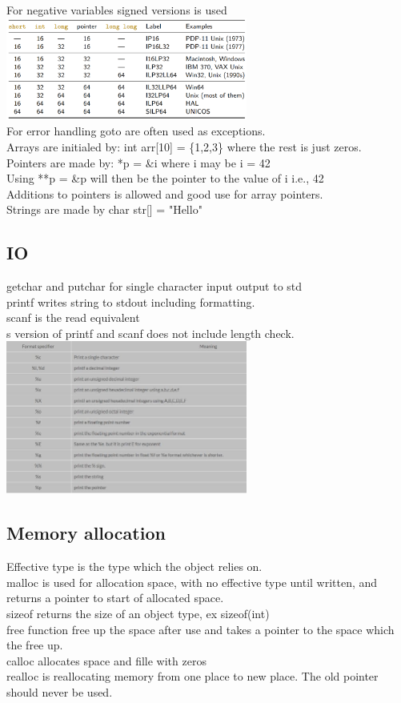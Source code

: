 \documentclass[12pt, a4paper]{article}
\begin{document}
		For negative variables signed versions is used\\
		\includegraphics[width=300px]{assets/cDataSize.png}\\
		For error handling goto are often used as exceptions.\\
		Arrays are initialed by: int arr[10] = \{1,2,3\} where the rest is just zeros.\\
		Pointers are made by: *p = \&i where i may be i = 42\\
		Using **p = \&p will then be the pointer to the value of i i.e., 42\\
		Additions to pointers is allowed and good use for array pointers.\\
		Strings are made by char str[] = "Hello"
		\subsection{IO}
			getchar and putchar for single character input output to std\\
			printf writes string to stdout including formatting.\\
			scanf is the read equivalent\\
			s version of printf and scanf does not include length check.\\
			\includegraphics[width=300px]{assets/printFormatters.jpg}
		\subsection{Memory allocation}
			Effective type is the type which the object relies on.\\
			malloc is used for allocation space, with no effective type until written, and returns a pointer to start of allocated space.\\
			sizeof returns the size of an object type, ex sizeof(int)\\
			free function free up the space after use and takes a pointer to the space which the free up.\\
			calloc allocates space and fille with zeros\\
			realloc is reallocating memory from one place to new place. The old pointer should never be used.\\
\end{document}
